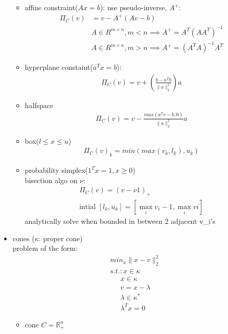 \documentclass[8pt,letter]{article}
\newcommand{\R}{\mathbb{R}}
\begin{document}
\begin{multicols*}{2}
\begin{itemize}
\begin{itemize}
      \item affine constraint($Ax=b$): use pseudo-inverse, $A^{+}$:
        \begin{align*}
          \Pi_C(v) &= v - A^{+}(Av-b)\\
          &A \in R^{m \times n}, m < n \implies A^{+} = A^T(AA^T)^{-1}\\
          &A \in R^{m \times n}, m > n \implies A^{+} = (A^TA)^{-1}A^T
        \end{align*}
      \item hyperplane constaint($a^Tx=b$):
        \begin{align*}
          \Pi_C(v) = v + (\frac{b-a^Tb}{\|a\|_2^2})a
        \end{align*}
      \item halfspace
        \begin{align*}
          \Pi_C(v) = v - \frac{max(a^T v -b,0)}{\|a\|_2^2}a
        \end{align*}
      \item box($l\leq x \leq u$)
        \begin{align*}
          \Pi_C(v)_k = min(max(v_k, l_k), u_k)
        \end{align*}
      \item probability simplex($1^Tx= 1, x \geq 0$)\\
        bisection algo on $\nu$:
        \begin{align*}
          \Pi_C(v) = (v- \nu 1)_+\\
          \text{intial }[l_k,u_k] = [\max_i v_i-1, \max_i vi]
        \end{align*}
        analytically solve when bounded in between 2 adjacent v_i's      
      \end{itemize}
    \item cones ($\kappa$: proper cone)\\
      problem of the form:
      \begin{align*}
        min_x \|x-v\|_2^2\\
        s.t.: x\in \kappa
      \end{align*}
      \begin{align*}
        x \in \kappa\\
        v=x-\lambda\\
        \lambda\in\kappa^*\\
        \lambda^Tx=0
      \end{align*}
      \begin{itemize}
      \item cone $C=\R_+^n$

\end{itemize}
\end{itemize}
\end{multicols*}
\end{document}

